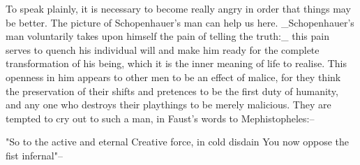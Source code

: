 To speak plainly, it is necessary to become really angry in order
that things may be better. The picture of Schopenhauer's man can help
us here. _Schopenhauer's man voluntarily takes upon himself the pain
of telling the truth:_ this pain serves to quench his individual will
and make him ready for the complete transformation of his being,
which it is the inner meaning of life to realise. This openness in
him appears to other men to be an effect of malice, for they think
the preservation of their shifts and pretences to be the first duty
of humanity, and any one who destroys their playthings to be merely
malicious. They are tempted to cry out to such a man, in Faust's
words to Mephistopheles:--

  "So to the active and eternal
  Creative force, in cold disdain
  You now oppose the fist infernal"--

